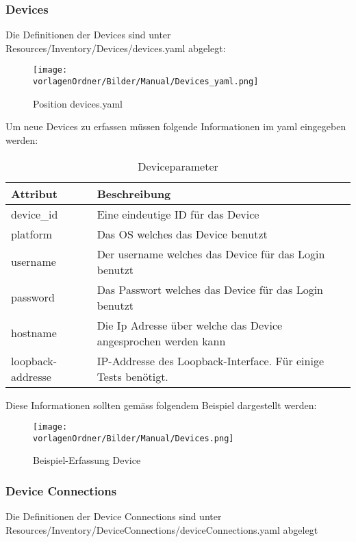 \documentclass[]{subfiles}
\begin{document}
	\subsubsection{Devices}
		Die Definitionen der Devices sind unter Resources/Inventory/Devices/devices.yaml abgelegt:

		\begin{figure}[h!]
			\begin{center}
				\texttt{[image: \\vorlagenOrdner/Bilder/Manual/Devices\_yaml.png]}
				\caption{Position devices.yaml}
			\end{center}
		\end{figure}

		Um neue Devices zu erfassen müssen folgende Informationen im yaml eingegeben werden:\\
		\begin{table}
			\begin{tabularx}{\textwidth}{lX}
			\toprule
			Attribut & Beschreibung \\
			\midrule
			device\_id & Eine eindeutige ID für das Device \\
			platform & Das OS welches das Device benutzt \\
			username & Der username welches das Device für das Login benutzt\\
			password & Das Passwort welches das Device für das Login benutzt\\
			hostname & Die Ip Adresse über welche das Device angesprochen werden kann\\
			loopback-addresse & IP-Addresse des Loopback-Interface. Für einige Tests benötigt.\\
			\midrule
			\end{tabularx}
			\caption{Deviceparameter}
		\end{table}
		
		Diese Informationen sollten gemäss folgendem Beispiel dargestellt werden: 

		\begin{figure}[h!]
			\begin{center}
				\texttt{[image: \\vorlagenOrdner/Bilder/Manual/Devices.png]}
				\caption{Beispiel-Erfassung Device}
			\end{center}
		\end{figure}

	\subsubsection{Device Connections}
		Die Definitionen der Device Connections sind unter 
		Resources/Inventory/DeviceConnections/deviceConnections.yaml abgelegt
\end{document}
